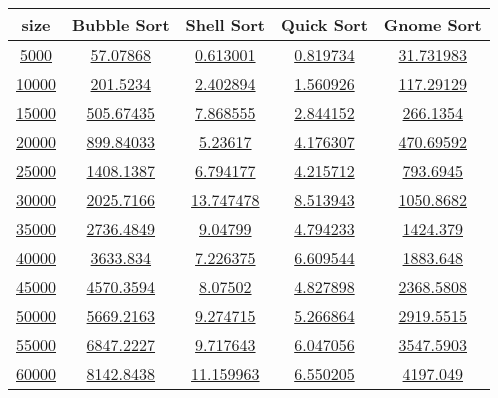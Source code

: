 \newsavebox{\sorttimealg}
\begin{lrbox}{\sorttimealg}
\begin{tabular}{|c|c|c|c|c|}
\hline
\textbf{size} & \textbf{Bubble Sort} & \textbf{Shell Sort} & \textbf{Quick Sort} & \textbf{Gnome Sort}\\
\hline\hline
{\href{T2.0.0}{5000}} & {\href{T2.0.1}{57.07868}} & {\href{T2.0.2}{0.613001}} & {\href{T2.0.3}{0.819734}} & {\href{T2.0.4}{31.731983}}\\
\hline
{\href{T2.1.0}{10000}} & {\href{T2.1.1}{201.5234}} & {\href{T2.1.2}{2.402894}} & {\href{T2.1.3}{1.560926}} & {\href{T2.1.4}{117.29129}}\\
\hline
{\href{T2.2.0}{15000}} & {\href{T2.2.1}{505.67435}} & {\href{T2.2.2}{7.868555}} & {\href{T2.2.3}{2.844152}} & {\href{T2.2.4}{266.1354}}\\
\hline
{\href{T2.3.0}{20000}} & {\href{T2.3.1}{899.84033}} & {\href{T2.3.2}{5.23617}} & {\href{T2.3.3}{4.176307}} & {\href{T2.3.4}{470.69592}}\\
\hline
{\href{T2.4.0}{25000}} & {\href{T2.4.1}{1408.1387}} & {\href{T2.4.2}{6.794177}} & {\href{T2.4.3}{4.215712}} & {\href{T2.4.4}{793.6945}}\\
\hline
{\href{T2.5.0}{30000}} & {\href{T2.5.1}{2025.7166}} & {\href{T2.5.2}{13.747478}} & {\href{T2.5.3}{8.513943}} & {\href{T2.5.4}{1050.8682}}\\
\hline
{\href{T2.6.0}{35000}} & {\href{T2.6.1}{2736.4849}} & {\href{T2.6.2}{9.04799}} & {\href{T2.6.3}{4.794233}} & {\href{T2.6.4}{1424.379}}\\
\hline
{\href{T2.7.0}{40000}} & {\href{T2.7.1}{3633.834}} & {\href{T2.7.2}{7.226375}} & {\href{T2.7.3}{6.609544}} & {\href{T2.7.4}{1883.648}}\\
\hline
{\href{T2.8.0}{45000}} & {\href{T2.8.1}{4570.3594}} & {\href{T2.8.2}{8.07502}} & {\href{T2.8.3}{4.827898}} & {\href{T2.8.4}{2368.5808}}\\
\hline
{\href{T2.9.0}{50000}} & {\href{T2.9.1}{5669.2163}} & {\href{T2.9.2}{9.274715}} & {\href{T2.9.3}{5.266864}} & {\href{T2.9.4}{2919.5515}}\\
\hline
{\href{T2.10.0}{55000}} & {\href{T2.10.1}{6847.2227}} & {\href{T2.10.2}{9.717643}} & {\href{T2.10.3}{6.047056}} & {\href{T2.10.4}{3547.5903}}\\
\hline
{\href{T2.11.0}{60000}} & {\href{T2.11.1}{8142.8438}} & {\href{T2.11.2}{11.159963}} & {\href{T2.11.3}{6.550205}} & {\href{T2.11.4}{4197.049}}\\

\end{tabular}
\end{lrbox}
